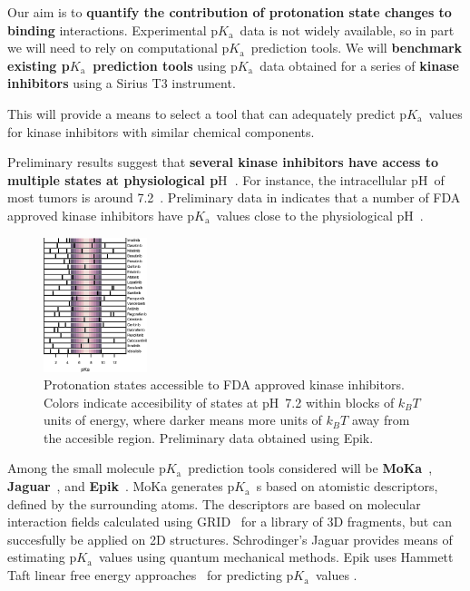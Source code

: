 \documentclass[10pt,final]{article}
\newcommand{\pKa}{p$K_\mathrm{a}$\ }
\newcommand{\pH}{p$\mathrm{H}$\ }
\begin{document}
Our aim is to \textbf{quantify the contribution of protonation state changes to binding} interactions. Experimental \pKa data is not widely available, so in part we will need to rely on computational \pKa prediction tools. We will \textbf{benchmark existing \pKa prediction tools}  using \pKa data obtained for a series of \textbf{kinase inhibitors} using a Sirius T3 instrument.

This will provide a means to select a tool that can adequately predict \pKa values for kinase inhibitors with similar chemical components.

Preliminary results suggest that \textbf{several kinase inhibitors have access to multiple states  at physiological \pH}. For instance, the intracellular \pH of most tumors is around 7.2~\cite{Griffiths1991a,Stubbs2000a}. Preliminary data in  indicates that a number of FDA approved kinase inhibitors have \pKa values close to the physiological \pH.
\begin{figure}[H]
	\centering
	\includegraphics[width=0.27\textwidth]{figures/inhibitor-pKas.png}
	\caption{Protonation states accessible to FDA approved kinase inhibitors. Colors indicate accesibility of states at \pH 7.2 within blocks of $k_BT$ units of energy, where darker means more units of $k_BT$ away from the accesible region. Preliminary data obtained using Epik.~\cite{Shelley2007a,Greenwood2010a}}
	\label{figure:pka-kinase}
\end{figure}

Among the small molecule \pKa prediction tools considered will be \textbf{MoKa}~\cite{Milletti2007a}, \textbf{Jaguar}~\cite{Bochevarov2013a}, and \textbf{Epik}~\cite{Shelley2007a,Greenwood2010a}.
MoKa generates \pKa{}s based on atomistic descriptors, defined by the surrounding atoms. The descriptors are based on molecular interaction fields calculated using GRID~\cite{Goodford1985a} for a library of 3D fragments, but can succesfully be applied on 2D structures.
Schrodinger's Jaguar provides means of estimating \pKa values using quantum mechanical methods.
Epik uses Hammett Taft linear free energy approaches~\cite{Perrin1981a} for predicting \pKa values .
\end{document}
